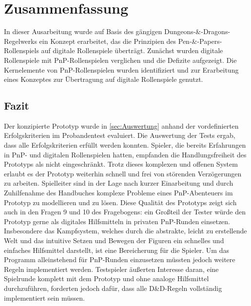 \chapter{Zusammenfassung}
\label{conclusion}
In dieser Ausarbeitung wurde auf Basis des gängigen Dungeons-\&-Dragons-Regel\-werks ein Konzept erarbeitet, das die Prinzipien des Pen-\&-Papers-Rollenspiels auf digitale Rollenspiele überträgt. Zunächst wurden digitale Rollenspiele mit PnP-Rollenspielen verglichen und die Defizite aufgezeigt. Die Kernelemente von PnP-Rollenspielen wurden identifiziert und zur Erarbeitung eines Konzeptes zur Übertragung auf digitale Rollenspiele genutzt.\\

\section{Fazit}
Der konzipierte Prototyp wurde in \ref{sec:Auswertung} anhand der vordefinierten Erfolgskriterien im Probandentest evaluiert. Die Auswertung der Tests ergab, dass alle Erfolgskriterien erfüllt werden konnten. Spieler, die bereits Erfahrungen in PnP- und digitalen Rollenspielen hatten, empfanden die Handlungsfreiheit des Prototyps als nicht eingeschränkt. Trotz dieses komplexen und offenen System erlaubt es der Prototyp weiterhin schnell und frei von störenden Verzögerungen zu arbeiten. Spielleiter sind in der Lage nach kurzer Einarbeitung und durch Zuhilfenahme des Handbuches komplexe Probleme eines PnP-Abenteuers im Prototyp zu modellieren und zu lösen. Diese Qualität des Prototyps zeigt sich auch in den Fragen 9 und 10 des Fragebogens: ein Großteil der Tester würde den Prototyp gerne als digitales Hilfsmitteln in privaten PnP-Runden einsetzen. Insbesondere das Kampfsystem, welches durch die abstrakte, leicht zu erstellende Welt und das intuitive Setzen und Bewegen der Figuren ein schnelles und einfaches Hilfsmittel darstellt, ist eine Bereicherung für die Spieler.\newline
Um das Programm alleinstehend für PnP-Runden einzusetzen müssten jedoch weitere Regeln implementiert werden. Testspieler äußerten Interesse daran, eine Spielrunde komplett mit dem Prototyp und ohne analoge Hilfsmittel durchzuführen, forderten jedoch dafür, dass alle D\&D-Regeln vollständig implementiert sein müssen.



